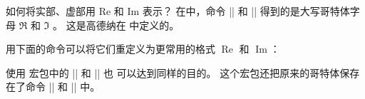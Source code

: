 \begin{myQA}{如何将实部、虚部用 Re 和 Im 表示？}
	在\LaTeXTeX 中，命令 \code|\Re| 和 \code|\Im| 得到的是大写哥特体字母
	$\Re$  和 $\Im$ 。
	这是高德纳在  中定义的。
	
	用下面的命令可以将它们重定义为更常用的格式 $\operatorname{Re}$
	和 $\operatorname{Im}$：
\begin{myCode}
\renewcommand{\Re}{\operatorname{Re}}
\renewcommand{\Im}{\operatorname{Im}}
\end{myCode}
	
	使用   宏包中的 \code|\Re| 和 \code|\Im| 也
	可以达到同样的目的。
	这个宏包还把原来的哥特体保存在了命令 \code|\real| 和 \code|\imaginary| 中。
	 
	
\end{myQA}

